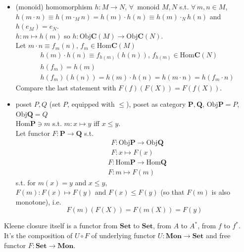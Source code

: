 \begin{itemize}
	\item (monoid) homomorphism $h: M \to N$, $\forall \, $ monoid $M, N$ s.t. $\forall \, m,n \in M$, \\
	$h(m\cdot n) \equiv h(m\cdot_M n) = h(m) \cdot h(n) \equiv h(m) \cdot_N h(n)$ and \\
	$h(e_M) = e_N$. \\
	
	$h:m \mapsto h(m)$ so $h: \text{Obj}\mathbf{C}(M) \to \text{Obj}\mathbf{C}(N)$. \\
	Let $m\cdot n \equiv f_m(n)$, $f_m \in \text{Hom}\mathbf{C}(M)$
	\[
	\begin{aligned}
		& h(m) \cdot h(n) \equiv f_{h(m)}(h(n)), \, f_{h(m)} \in \text{Hom}\mathbf{C}(N) \\
 		& h(f_m) = h(m) \\
		& h(f_m)(h(n)) = h(m)\cdot h(n) = h(m\cdot n) = h(f_m\cdot n)
	\end{aligned}
	\]
	Compare the last statement with $F(f)(F(X)) = F(f(X))$.
	\item poset $P, Q$ (set $P$, equipped with $\leq$), poset as category $\mathbf{P}, \mathbf{Q}$, $\text{Obj}\mathbf{P} = P$, $\text{Obj}\mathbf{Q} = Q$ \\
	$\text{Hom}\mathbf{P} \ni m$ s.t. $m:x \mapsto y$ iff $x\leq y$. \\
	
	Let functor $F: \mathbf{P} \to \mathbf{Q}$ s.t. 
	\[
	\begin{aligned} 
		& F: \text{Obj}\mathbf{P} \to \text{Obj}\mathbf{Q} \\  
		&	F: x \mapsto F(x)
	\end{aligned} 
	\]
	\[
	\begin{aligned}
		& F: \text{Hom}\mathbf{P} \to \text{Hom}\mathbf{Q} \\ 
		& F: m \mapsto F(m)
	\end{aligned}
	\]
	s.t. for $m(x) =y$ and $x\leq y$, \\
	$F(m): F(x) \mapsto F(y)$ and $F(x) \leq F(y)$ (so that $F(m)$ is also monotone), i.e.
	\[
	F(m)(F(X)) = F(m(X)) = F(y)
	\]
\end{itemize}

Kleene closure itself is a functor from $\mathbf{Set}$ to $\textbf{Set}$, from $A$ to $A^*$, from $f$ to $f^*$. \\
It's the composition of $U\circ F$ of underlying functor $U:\textbf{Mon} \to \textbf{Set}$ and free functor $F:\textbf{Set} \to \textbf{Mon}$. 

